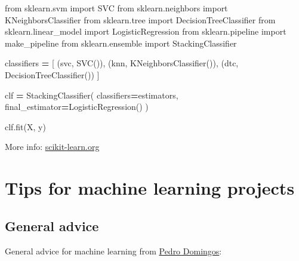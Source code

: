 \documentclass[
]{book}
\newenvironment{Shaded}{\begin{snugshade}}{\end{snugshade}}
\newcommand{\ImportTok}[1]{#1}
\newcommand{\NormalTok}[1]{#1}
\newcommand{\OperatorTok}[1]{\textcolor[rgb]{0.81,0.36,0.00}{\textbf{#1}}}
\newcommand{\StringTok}[1]{\textcolor[rgb]{0.31,0.60,0.02}{#1}}
\begin{document}
\begin{Shaded}
\begin{Highlighting}[]
\ImportTok{from}\NormalTok{ sklearn.svm }\ImportTok{import}\NormalTok{ SVC}
\ImportTok{from}\NormalTok{ sklearn.neighbors }\ImportTok{import}\NormalTok{ KNeighborsClassifier}
\ImportTok{from}\NormalTok{ sklearn.tree }\ImportTok{import}\NormalTok{ DecisionTreeClassifier}
\ImportTok{from}\NormalTok{ sklearn.linear\_model }\ImportTok{import}\NormalTok{ LogisticRegression}
\ImportTok{from}\NormalTok{ sklearn.pipeline }\ImportTok{import}\NormalTok{ make\_pipeline}
\ImportTok{from}\NormalTok{ sklearn.ensemble }\ImportTok{import}\NormalTok{ StackingClassifier}

\NormalTok{classifiers }\OperatorTok{=}\NormalTok{ [}
\NormalTok{    (}\StringTok{\textquotesingle{}svc\textquotesingle{}}\NormalTok{, SVC()),}
\NormalTok{    (}\StringTok{\textquotesingle{}knn\textquotesingle{}}\NormalTok{, KNeighborsClassifier()),}
\NormalTok{    (}\StringTok{\textquotesingle{}dtc\textquotesingle{}}\NormalTok{, DecisionTreeClassifier())}
\NormalTok{    ]}
    
\NormalTok{clf }\OperatorTok{=}\NormalTok{ StackingClassifier(}
\NormalTok{    classifiers}\OperatorTok{=}\NormalTok{estimators, final\_estimator}\OperatorTok{=}\NormalTok{LogisticRegression()}
\NormalTok{    )}

\NormalTok{clf.fit(X, y)}
\end{Highlighting}
\end{Shaded}

More info:
\href{https://scikit-learn.org/stable/modules/generated/sklearn.ensemble.StackingClassifier.html}{scikit-learn.org}

\hypertarget{tips-for-machine-learning-projects}{%
\section{Tips for machine learning projects}\label{tips-for-machine-learning-projects}}

\hypertarget{general-advice}{%
\subsection{General advice}\label{general-advice}}

General advice for machine learning from \href{https://courses.cs.duke.edu/spring20/compsci527/papers/Domingos.pdf}{Pedro
Domingos}:
\end{document}
